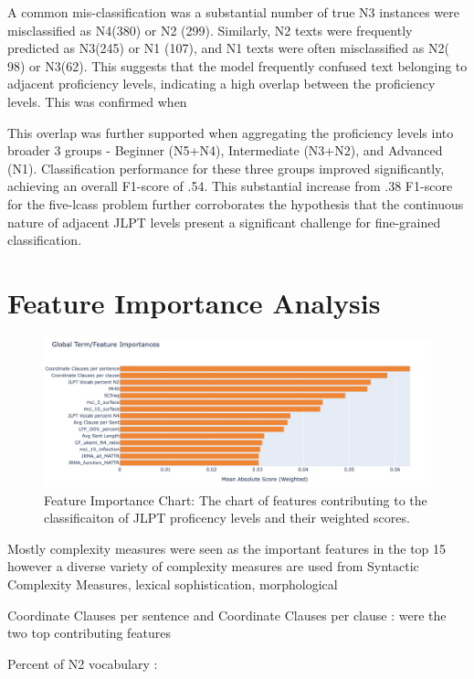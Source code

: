 A common mis-classification was a substantial number of true N3 instances were misclassified as N4(380) or N2 (299).
Similarly, N2 texts were frequently predicted as N3(245) or N1 (107), and N1 texts were often misclassified as N2(
98) or N3(62). This suggests that the model frequently confused text belonging to adjacent proficiency levels,
indicating a high overlap between the proficiency levels. This was confirmed when

This overlap was further supported when aggregating the proficiency levels into broader 3 groups - Beginner (N5+N4),
Intermediate (N3+N2), and
Advanced (N1).
Classification performance for these three groups improved significantly, achieving an overall F1-score of .54. This
substantial increase from .38 F1-score for the five-lcass problem further corroborates the hypothesis that the
continuous nature of adjacent JLPT levels present a significant challenge for fine-grained classification.

\section{Feature Importance Analysis}
\begin{figure}[h!]
    \centering
    \includegraphics[scale=.4]{img/feature_importance}
    \caption[Feature Importance Chart]{ Feature Importance Chart: The chart of features contributing to the classificaiton of JLPT proficency levels and their weighted
    scores.}
    \label{fig:featureimportance}
\end{figure}

Mostly complexity measures were seen as the important features in the top 15 however a diverse variety of complexity
measures are used from Syntactic Complexity Measures, lexical sophistication, morphological

Coordinate Clauses per sentence and Coordinate Clauses per clause : were the two top contributing features

Percent of N2 vocabulary :

